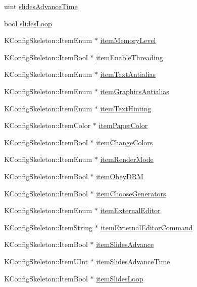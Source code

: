 \begin{DoxyCompactItemize}
\item 
uint \hyperlink{classOkular_1_1SettingsCorePrivate_ab02e22e0548486391fa4394ba41e0a3e}{slides\+Advance\+Time}
\item 
bool \hyperlink{classOkular_1_1SettingsCorePrivate_a55785f695ad1a5457c9cda354f974b80}{slides\+Loop}
\item 
K\+Config\+Skeleton\+::\+Item\+Enum $\ast$ \hyperlink{classOkular_1_1SettingsCorePrivate_ad06afd9bb29a2031d0b8b59834b8a650}{item\+Memory\+Level}
\item 
K\+Config\+Skeleton\+::\+Item\+Bool $\ast$ \hyperlink{classOkular_1_1SettingsCorePrivate_a18c995e3eb7f888a24600d0346e0ef5e}{item\+Enable\+Threading}
\item 
K\+Config\+Skeleton\+::\+Item\+Enum $\ast$ \hyperlink{classOkular_1_1SettingsCorePrivate_aa4e6e995b9745ec8aebb6a33674cca51}{item\+Text\+Antialias}
\item 
K\+Config\+Skeleton\+::\+Item\+Enum $\ast$ \hyperlink{classOkular_1_1SettingsCorePrivate_adcf521e8a4539ff836c4f48c5a09a472}{item\+Graphics\+Antialias}
\item 
K\+Config\+Skeleton\+::\+Item\+Enum $\ast$ \hyperlink{classOkular_1_1SettingsCorePrivate_ac0923ea9d0acc5f0abe431ed0f4fca98}{item\+Text\+Hinting}
\item 
K\+Config\+Skeleton\+::\+Item\+Color $\ast$ \hyperlink{classOkular_1_1SettingsCorePrivate_a7c87e39720150455f90a96214e2cca2b}{item\+Paper\+Color}
\item 
K\+Config\+Skeleton\+::\+Item\+Bool $\ast$ \hyperlink{classOkular_1_1SettingsCorePrivate_a5254075bc2d138a58c2eb25811e18e23}{item\+Change\+Colors}
\item 
K\+Config\+Skeleton\+::\+Item\+Enum $\ast$ \hyperlink{classOkular_1_1SettingsCorePrivate_a71e8dac91dc9da059a8a263611d5326b}{item\+Render\+Mode}
\item 
K\+Config\+Skeleton\+::\+Item\+Bool $\ast$ \hyperlink{classOkular_1_1SettingsCorePrivate_a9c750a7d32e4513c0b42b8e2d567fd67}{item\+Obey\+D\+R\+M}
\item 
K\+Config\+Skeleton\+::\+Item\+Bool $\ast$ \hyperlink{classOkular_1_1SettingsCorePrivate_a92c13edf8b753540c0935dbd3d713444}{item\+Choose\+Generators}
\item 
K\+Config\+Skeleton\+::\+Item\+Enum $\ast$ \hyperlink{classOkular_1_1SettingsCorePrivate_aae0212ef7eab85cc329d71fcb28c16fe}{item\+External\+Editor}
\item 
K\+Config\+Skeleton\+::\+Item\+String $\ast$ \hyperlink{classOkular_1_1SettingsCorePrivate_a469d8f43886ab0df9650865b68dd911f}{item\+External\+Editor\+Command}
\item 
K\+Config\+Skeleton\+::\+Item\+Bool $\ast$ \hyperlink{classOkular_1_1SettingsCorePrivate_a0fd9d5aaed5f7710aa864b4a14205fce}{item\+Slides\+Advance}
\item 
K\+Config\+Skeleton\+::\+Item\+U\+Int $\ast$ \hyperlink{classOkular_1_1SettingsCorePrivate_af1eb3ad8f742a1589e5d07caa145ddbe}{item\+Slides\+Advance\+Time}
\item 
K\+Config\+Skeleton\+::\+Item\+Bool $\ast$ \hyperlink{classOkular_1_1SettingsCorePrivate_a571e262885930ba6549d3af5f9328f67}{item\+Slides\+Loop}
\end{DoxyCompactItemize}


